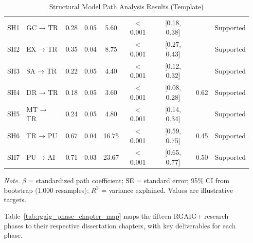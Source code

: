 \begingroup\singlespacing\tablefontsize\tablestripes
\begin{xltabular}{\textwidth}{@{} c l c c c c c c l @{}}
\caption{Structural Model Path Analysis Results (Template)}
\label{tab:rgaig_sem_path_results}\\
\toprule
{} &  & \thead{$\beta$} &  &  &  &  &  &  \\
\midrule
\endfirsthead
\endhead
\bottomrule
\endlastfoot
SH1 & GC → TR & 0.28 & 0.05 & 5.60 & $<$0.001 & [0.18, 0.38] & & Supported \\
SH2 & EX → TR & 0.35 & 0.04 & 8.75 & $<$0.001 & [0.27, 0.43] & & Supported \\
SH3 & SA → TR & 0.22 & 0.05 & 4.40 & $<$0.001 & [0.12, 0.32] & & Supported \\
SH4 & DR → TR & 0.18 & 0.05 & 3.60 & $<$0.001 & [0.08, 0.28] & 0.62 & Supported \\
SH5 & MT → TR & 0.24 & 0.05 & 4.80 & $<$0.001 & [0.14, 0.34] & & Supported \\
SH6 & TR → PU & 0.67 & 0.04 & 16.75 & $<$0.001 & [0.59, 0.75] & 0.45 & Supported \\
SH7 & PU → AI & 0.71 & 0.03 & 23.67 & $<$0.001 & [0.65, 0.77] & 0.50 & Supported \\
\end{xltabular}
\par\smallskip\noindent\textit{Note.} $\beta$ = standardized path coefficient; SE = standard error; 95\% CI from bootstrap (1,000 resamples); $R^2$ = variance explained. Values are illustrative targets.
\endgroup

Table~\ref{tab:rgaig_phase_chapter_map} maps the fifteen RGAIG+ research phases to their respective dissertation chapters, with key deliverables for each phase.

